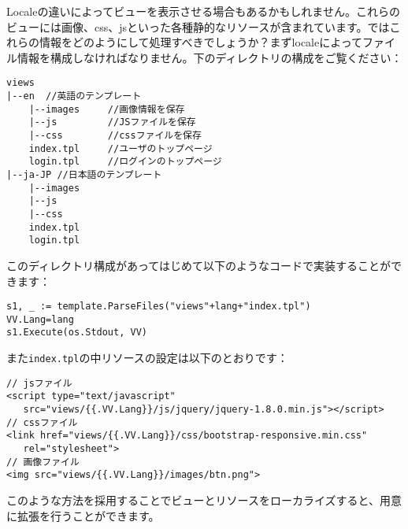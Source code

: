 Localeの違いによってビューを表示させる場合もあるかもしれません。これらのビューには画像、css、jsといった各種静的なリソースが含まれています。ではこれらの情報をどのようにして処理すべきでしょうか？まずlocaleによってファイル情報を構成しなければなりません。下のディレクトリの構成をご覧ください：


\begin{lstlisting}[numbers=none]
views
|--en  //英語のテンプレート
    |--images     //画像情報を保存
    |--js         //JSファイルを保存
    |--css        //cssファイルを保存
    index.tpl     //ユーザのトップページ
    login.tpl     //ログインのトップページ
|--ja-JP //日本語のテンプレート
    |--images
    |--js
    |--css
    index.tpl
    login.tpl
\end{lstlisting}

このディレクトリ構成があってはじめて以下のようなコードで実装することができます：

\begin{lstlisting}[numbers=none]
s1, _ := template.ParseFiles("views"+lang+"index.tpl")
VV.Lang=lang
s1.Execute(os.Stdout, VV)
\end{lstlisting}

また\texttt{index.tpl}の中リソースの設定は以下のとおりです：

\begin{lstlisting}[numbers=none]
// jsファイル
<script type="text/javascript"
   src="views/{{.VV.Lang}}/js/jquery/jquery-1.8.0.min.js"></script>
// cssファイル
<link href="views/{{.VV.Lang}}/css/bootstrap-responsive.min.css"
   rel="stylesheet">
// 画像ファイル
<img src="views/{{.VV.Lang}}/images/btn.png">
\end{lstlisting}


このような方法を採用することでビューとリソースをローカライズすると、用意に拡張を行うことができます。
